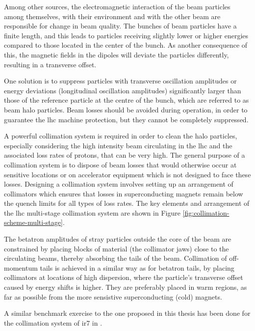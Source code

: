 \documentclass[encoding=utf8,british]{tumphthesis}
\begin{document}
Among other sources, the electromagnetic interaction of the beam particles among themselves, with their environment and with the other beam are responsible for change in beam quality. The bunches of beam particles have a finite length, and this leads to particles receiving slightly lower or higher energies compared to those located in the center of the bunch. As another consequence of this, the magnetic fields in the dipoles will deviate the particles differently, resulting in a transverse offset.

One solution is to suppress particles with transverse oscillation amplitudes or energy deviations (longitudinal oscillation amplitudes) significantly larger than those of the reference particle at the centre of the bunch, which are referred to as beam halo particles. Beam losses should be avoided during operation, in order to guarantee the \acrshort{lhc} machine protection, but they cannot be completely suppressed.

A powerful collimation system is required in order to clean the halo particles, especially considering the high intensity beam circulating in the \acrshort{lhc} and the associated loss rates of protons, that can be very high. The general purpose of a collimation system is to dispose of beam losses that would otherwise occur at sensitive locations or on accelerator equipment which is not designed to face these losses. Designing a collimation system involves setting up an arrangement of collimators which ensures that losses in superconducting magnets remain below the quench limits for all types of loss rates. The key elements and arrangement of the \acrshort{lhc} multi-stage collimation system are shown in Figure \ref{fig:collimation-scheme-multi-stage}.

The betatron amplitudes of stray particles outside the core of the beam are constrained by placing blocks of material (the collimator jaws) close to the circulating beams, thereby absorbing the tails of the beam. Collimation of off-momentum tails is achieved in a similar way as for betatron tails, by placing collimators at locations of high dispersion, where the particle’s transverse offset caused by energy shifts is higher. They are preferably placed in warm regions, as far as possible from the more sensistive superconducting (cold) magnets.



A similar benchmark exercise to the one proposed in this thesis has been done for the collimation system of \acrshort{ir}7 in \cite{Skordis:2018fht}.
\end{document}
